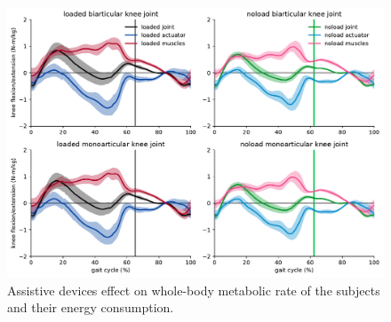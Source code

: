 \documentclass[10pt,letterpaper]{article}
\begin{document}
\begin{figure}[h]
	\hspace*{-2cm}   
	\centering
	\includegraphics[scale=0.40]{Ideal_Exo_MonovsBi_Figures/Exoskeletons_Knee_Torque.pdf}
	\caption{Assistive devices effect on whole-body metabolic rate of the subjects and their energy consumption.}
	\label{Fig_IdealExo_Knee_Torque}
\end{figure}
\end{document}
